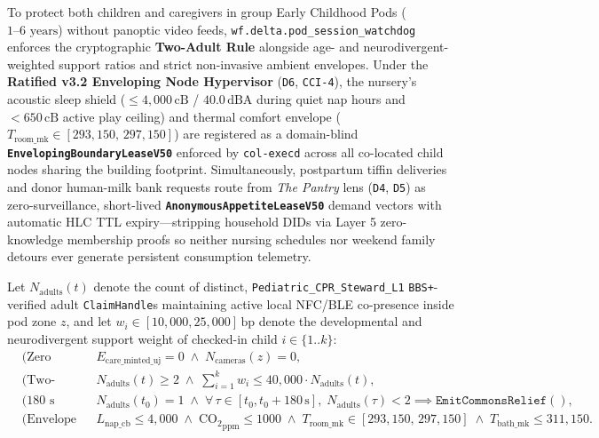To protect both children and caregivers in group Early Childhood Pods ($1\text{--}6\text{ years}$)
without panoptic video feeds, \texttt{wf.delta.pod\_session\_watchdog} enforces the
cryptographic \textbf{Two-Adult Rule} alongside age- and neurodivergent-weighted support ratios
and strict non-invasive ambient envelopes. Under the \textbf{Ratified v3.2 Enveloping Node
Hypervisor} (\texttt{D6}, \texttt{CCI-4}), the nursery's acoustic sleep shield ($\le 4{,}000\,\mathrm{cB}$
/ $40.0\,\mathrm{dBA}$ during quiet nap hours and $< 650\,\mathrm{cB}$ active play ceiling) and
thermal comfort envelope ($T_{\mathrm{room\_mk}} \in [293{,}150,\, 297{,}150]$) are registered as
a domain-blind \textbf{\texttt{EnvelopingBoundaryLeaseV50}} enforced by \texttt{col-execd} across
all co-located child nodes sharing the building footprint. Simultaneously, postpartum tiffin
deliveries and donor human-milk bank requests route from \textit{The Pantry} lens (\texttt{D4},
\texttt{D5}) as zero-surveillance, short-lived \textbf{\texttt{AnonymousAppetiteLeaseV50}} demand
vectors with automatic HLC TTL expiry---stripping household DIDs via Layer 5 zero-knowledge
membership proofs so neither nursing schedules nor weekend family detours ever generate persistent
consumption telemetry.

\begin{invariant}
\label{inv:delta-pod}
Let $N_{\mathrm{adults}}(t)$ denote the count of distinct, \texttt{Pediatric\_CPR\_Steward\_L1}
\texttt{BBS+}-verified adult \texttt{ClaimHandle}s maintaining active local NFC/BLE co-presence
inside pod zone $z$, and let $w_i \in [10{,}000, 25{,}000]\,\mathrm{bp}$ denote the developmental
and neurodivergent support weight of checked-in child $i \in \{1..k\}$:
{\footnotesize
\begin{align}
    &\text{(Zero Care Minting)} && E_{\mathrm{care\_minted\_uj}} = 0 \;\land\; N_{\mathrm{cameras}}(z) = 0, \label{eq:delta-nontoken}\\
    &\text{(Two-Adult \& Ratio)} && N_{\mathrm{adults}}(t) \ge 2 \;\land\; \sum_{i=1}^{k} w_i \le 40{,}000 \cdot N_{\mathrm{adults}}(t), \label{eq:delta-ratio}\\
    &\text{(180 s Relief Timer)} && N_{\mathrm{adults}}(t_0) = 1 \;\land\; \forall\,\tau \in [t_0, t_0 + 180\,\mathrm{s}],\; N_{\mathrm{adults}}(\tau) < 2 \implies \mathtt{EmitCommonsRelief}(), \label{eq:delta-180s}\\
    &\text{(Envelope \& Bath)} && L_{\mathrm{nap\_cb}} \le 4{,}000 \;\land\; \mathrm{CO_2}_{\mathrm{ppm}} \le 1000 \;\land\; T_{\mathrm{room\_mk}} \in [293{,}150,\, 297{,}150] \;\land\; T_{\mathrm{bath\_mk}} \le 311{,}150. \label{eq:delta-env}
\end{align}
}
\end{invariant}

